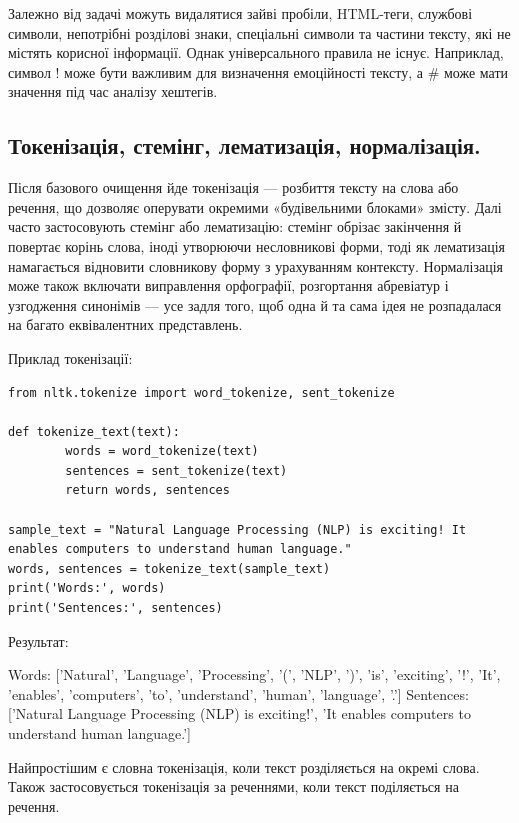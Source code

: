 Залежно від задачі можуть видалятися зайві пробіли, HTML-теги, службові символи, непотрібні розділові знаки, спеціальні символи та частини тексту, які не містять корисної інформації. Однак універсального правила не існує. Наприклад, символ ! може бути важливим для визначення емоційності тексту, а $\#$ може мати значення під час аналізу хештегів.


\subsection{Токенізація, стемінг, лематизація, нормалізація.}

Після базового очищення йде токенізація — розбиття тексту на слова або речення, що дозволяє оперувати окремими «будівельними блоками» змісту. Далі часто застосовують стемінг або лематизацію: стемінг обрізає закінчення й повертає корінь слова, іноді утворюючи несловникові форми, тоді як лематизація намагається відновити словникову форму з урахуванням контексту. Нормалізація може також включати виправлення орфографії, розгортання абревіатур і узгодження синонімів — усе задля того, щоб одна й та сама ідея не розпадалася на багато еквівалентних представлень.

Приклад токенізації:

\begin{lstlisting}
from nltk.tokenize import word_tokenize, sent_tokenize

def tokenize_text(text):
        words = word_tokenize(text)
        sentences = sent_tokenize(text)
        return words, sentences

sample_text = "Natural Language Processing (NLP) is exciting! It enables computers to understand human language."
words, sentences = tokenize_text(sample_text)
print('Words:', words)
print('Sentences:', sentences)
\end{lstlisting}

Результат:

\begin{console}
Words: ['Natural', 'Language', 'Processing', '(', 'NLP', ')', 'is', 'exciting', '!', 'It', 'enables', 'computers', 'to', 'understand', 'human', 'language', '.']
Sentences: ['Natural Language Processing (NLP) is exciting!', 'It enables computers to understand human language.']
\end{console}

Найпростішим є словна токенізація, коли текст розділяється на окремі слова. Також застосовується токенізація за реченнями, коли текст поділяється на речення.


